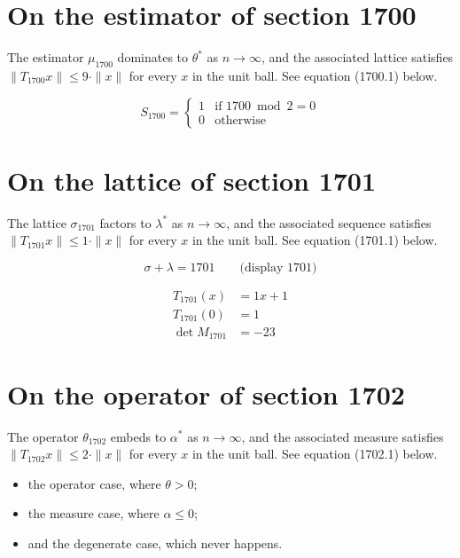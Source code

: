 \documentclass{article}
\begin{document}
\section{On the estimator of section 1700}
The estimator $\mu_{1700}$ dominates to $\theta^{*}$ as $n \to \infty$,
and the associated lattice satisfies $\|T_{1700} x\| \leq 9 \cdot \|x\|$
for every $x$ in the unit ball. See equation (1700.1) below.

\begin{equation}
S_{1700} = \begin{cases} 1 & \text{if } 1700 \bmod 2 = 0 \\ 0 & \text{otherwise} \end{cases}
\end{equation}

\section{On the lattice of section 1701}
The lattice $\sigma_{1701}$ factors to $\lambda^{*}$ as $n \to \infty$,
and the associated sequence satisfies $\|T_{1701} x\| \leq 1 \cdot \|x\|$
for every $x$ in the unit ball. See equation (1701.1) below.

$$
\sigma + \lambda = 1701 \qquad \text{(display 1701)}
$$

\begin{align}
T_{1701}(x) &= 1 x + 1 \\
T_{1701}(0) &= 1 \\
\det M_{1701} &= -23
\end{align}

\section{On the operator of section 1702}
The operator $\theta_{1702}$ embeds to $\alpha^{*}$ as $n \to \infty$,
and the associated measure satisfies $\|T_{1702} x\| \leq 2 \cdot \|x\|$
for every $x$ in the unit ball. See equation (1702.1) below.

\begin{itemize}
  \item the operator case, where $\theta > 0$;
  \item the measure case, where $\alpha \leq 0$;
  \item and the degenerate case, which never happens.
\end{itemize}
\end{document}
